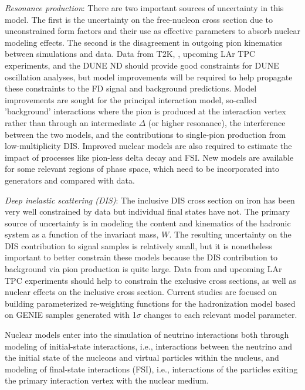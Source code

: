  \emph{Resonance production}:
  There are two important sources of uncertainty in this model. The first is the uncertainty on the free-nucleon
  cross section due to unconstrained form factors and their use as effective parameters to absorb nuclear
  modeling effects.
  The second is the disagreement in outgoing pion kinematics between simulations and data.
  Data from T2K, \minerva, upcoming LAr TPC experiments, and the DUNE ND should provide good constraints for DUNE
  oscillation analyses, but model improvements will be required to help propagate these constraints
  to the FD signal and background predictions. Model improvements are sought for the principal interaction
  model, so-called 'background' interactions where the pion is produced at the interaction vertex
  rather than through an intermediate $\Delta$ (or higher resonance), the interference between the two
  models, and the contributions to single-pion production from low-multiplicity DIS. Improved nuclear models
  are also required to estimate the impact of processes like pion-less delta decay and FSI. New models are
  available for some relevant regions of phase space, which need to be incorporated into generators and compared
  with data.

  \emph{Deep inelastic scattering (DIS)}: The inclusive DIS cross section on iron has been very well constrained by 
  data but individual final states have not. The primary source of uncertainty is in modeling the
  content and kinematics of the hadronic system as a function of the invariant mass, $W$. The resulting
  uncertainty on the DIS contribution to signal samples is relatively small, but it is nonetheless important
  to better constrain these models because the DIS contribution to background via pion production is quite large.
  Data from \minerva and upcoming LAr TPC experiments should help to constrain
  the exclusive cross sections, as well as nuclear effects on the inclusive cross section.
  Current studies are focused on building parameterized re-weighting 
  functions for the hadronization model based on GENIE samples generated with 1$\sigma$ changes to each relevant 
  model parameter.

Nuclear models enter into the simulation of neutrino interactions both through modeling of initial-state interactions,
i.e., interactions between the neutrino and the initial state of the nucleons and virtual particles within the nucleus,
and modeling of final-state interactions (FSI), i.e., interactions of the particles exiting the
primary interaction vertex with the nuclear medium. 

